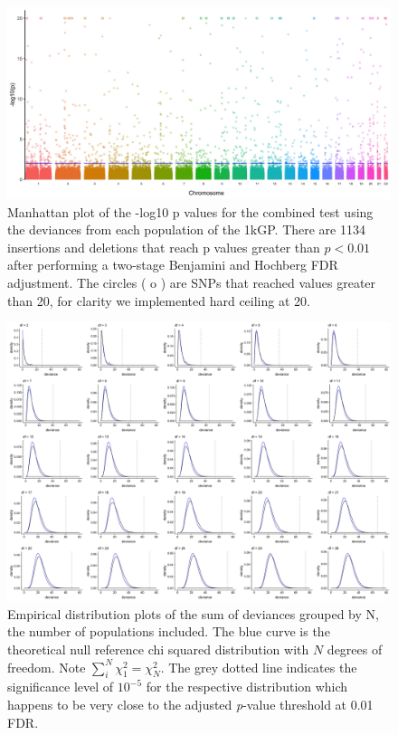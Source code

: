 \documentclass[9pt,lineno]{elife}
\begin{document}
\begin{figure}[h]
\includegraphics[width=\hsize,keepaspectratio]{./Figures/ManhattanPlot_indels.jpg}

\caption{Manhattan plot of the -log10 p values for the combined test using the deviances from each population of the 1kGP. 
There are 1134 insertions and deletions that reach p values greater than $ p < 0.01$ after performing a two-stage Benjamini and Hochberg FDR adjustment. 
The circles ( o ) are SNPs that reached values greater than 20, for clarity we implemented hard ceiling at 20.}
  \label{indels_Manhattan}
\end{figure}

\begin{figure}[h]
\includegraphics[width=\hsize,keepaspectratio]{./Figures/AllDeviances.jpg}

\caption{Empirical distribution plots of the sum of deviances grouped by N, the number of populations included. The blue curve is the theoretical null reference chi squared distribution with $N$ degrees of freedom. Note $\sum_i^N  \chi^2_1= \chi^2_N$. The grey dotted line indicates the significance level of $10^{-5}$ for the respective distribution which happens to be very close to the adjusted \textit{p}-value threshold at 0.01 FDR. }
\label{Deviances}
\end{figure}
\end{document}
